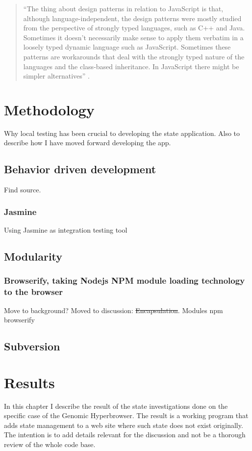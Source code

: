 \documentclass[english]{ifimaster}
\begin{document}
\begin{quotation}
“The thing about design patterns in relation to JavaScript is that, although language-independent, the design patterns were mostly studied from the perspective of strongly typed languages, such as C++ and Java. Sometimes it doesn’t necessarily make sense to apply them verbatim in a loosely typed dynamic language such as JavaScript. Sometimes these patterns are workarounds that deal with the strongly typed nature of the languages and the class-based inheritance. In JavaScript there might be simpler alternatives” \parencite[s. 2]{stefanov}.
\end{quotation}

\chapter{Methodology}
Why local testing has been crucial to developing the state application. Also to describe how I have moved forward developing the app.

\section{Behavior driven development}
Find source.

\subsection{Jasmine}
Using Jasmine as integration testing tool

\section{Modularity}
\subsection{Browserify, taking Nodejs NPM module loading technology to the browser}
Move to background?
Moved to discussion: \sout {Encapsulation}.
Modules
npm
browserify

\section{Subversion}



\chapter{Results}
In this chapter I describe the result of the state investigations done on the specific case of the Genomic Hyperbrowser. The result is a working program that adds state management to a web site where such state does not exist originally. The intention is to add details relevant for the discussion and not be a thorough review of the whole code base.
\end{document}
